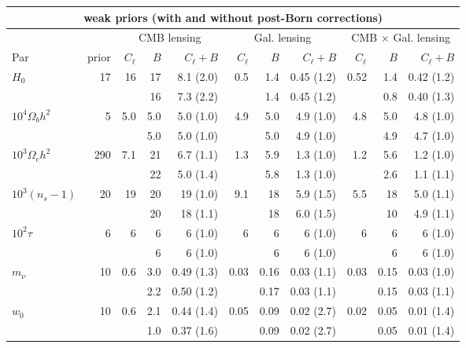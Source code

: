 \documentclass[11pt]{article} %
\begin{document}
\begin{table}
\centering
\scriptsize
\begin{tabular}{|l|r|rrr|rrr|rrr|}
\hline
\multicolumn{11}{|c|}{weak priors (with and without post-Born corrections)} \\
\hline
&& \multicolumn{3}{c|}{CMB lensing} & \multicolumn{3}{c|}{Gal. lensing} & \multicolumn{3}{c|}{CMB $\times$ Gal. lensing} \\
\hline
Par & prior & $C_\ell$ & $B$ & $C_\ell+B$ & $C_\ell$ & $B$ & $C_\ell+B$ & $C_\ell$ & $B$ & $C_\ell+B$ \\
\hline
$H_0$ & 17 & 16 & 17 & 8.1 (2.0) & 0.5 & 1.4 & 0.45 (1.2) & 0.52 & 1.4 & 0.42 (1.2)\\
\rowcolor{blue!10}
 & & & 16 & 7.3 (2.2) & & 1.4 & 0.45 (1.2) & & 0.8 & 0.40 (1.3) \\

$10^4\Omega_b h^2$ & 5 & 5.0 & 5.0 & 5.0 (1.0) & 4.9 & 5.0 & 4.9 (1.0) & 4.8 & 5.0 & 4.8 (1.0) \\
\rowcolor{blue!10}
 & & & 5.0 & 5.0 (1.0) & & 5.0 & 4.9 (1.0) & & 4.9 & 4.7 (1.0) \\

$10^3\Omega_c h^2$ & 290 & 7.1 & 21 & 6.7 (1.1) & 1.3 & 5.9 & 1.3 (1.0) & 1.2 & 5.6 & 1.2 (1.0)\\
\rowcolor{blue!10}
 & & & 22 & 5.0 (1.4) & & 5.8 & 1.3 (1.0) & & 2.6 & 1.1 (1.1) \\

$10^3(n_s-1)$ & 20 & 19 & 20 & 19 (1.0) & 9.1 & 18 & 5.9 (1.5) & 5.5 & 18 & 5.0 (1.1) \\
\rowcolor{blue!10}
 & & & 20 & 18 (1.1) & & 18 & 6.0 (1.5) & & 10 & 4.9 (1.1) \\

$10^2\tau$ & 6 & 6 & 6 & 6 (1.0) & 6 & 6 & 6 (1.0) & 6 & 6 & 6 (1.0)\\
\rowcolor{blue!10}
 & & & 6 & 6 (1.0) & & 6 & 6 (1.0) & & 6 & 6 (1.0) \\

$m_\nu$ & 10 & 0.6 & 3.0 & 0.49 (1.3) & 0.03 & 0.16 & 0.03 (1.1) & 0.03 & 0.15 & 0.03 (1.0)\\
\rowcolor{blue!10}
 & & & 2.2 & 0.50 (1.2) & & 0.17 & 0.03 (1.1) & & 0.15 & 0.03 (1.1) \\

$w_0$ & 10 & 0.6 & 2.1 & 0.44 (1.4) & 0.05 & 0.09 & 0.02 (2.7) & 0.02 & 0.05 & 0.01 (1.4)\\
\rowcolor{blue!10}
 & & & 1.0 & 0.37 (1.6) & & 0.09 & 0.02 (2.7) & & 0.05 & 0.01 (1.4) \\


\end{tabular}
\end{table}
\end{document}
